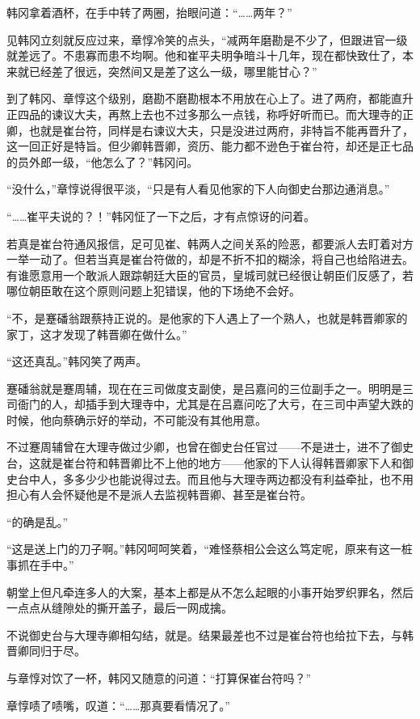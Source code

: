 韩冈拿着酒杯，在手中转了两圈，抬眼问道：“……两年？”

见韩冈立刻就反应过来，章惇冷笑的点头，“减两年磨勘是不少了，但跟进官一级就差远了。不患寡而患不均啊。他和崔平夫明争暗斗十几年，现在都快致仕了，本来就已经差了很远，突然间又是差了这么一级，哪里能甘心？”

到了韩冈、章惇这个级别，磨勘不磨勘根本不用放在心上了。进了两府，都能直升正四品的谏议大夫，再熬上去也不过多那么一点钱，称呼好听而已。而大理寺的正卿，也就是崔台符，同样是右谏议大夫，只是没进过两府，非特旨不能再晋升了，这一回正好是特旨。但少卿韩晋卿，资历、能力都不逊色于崔台符，却还是正七品的员外郎一级，“他怎么了？”韩冈问。

“没什么，”章惇说得很平淡，“只是有人看见他家的下人向御史台那边通消息。”

“……崔平夫说的？！”韩冈怔了一下之后，才有点惊讶的问着。

若真是崔台符通风报信，足可见崔、韩两人之间关系的险恶，都要派人去盯着对方一举一动了。但若当真是崔台符做的，却是不折不扣的糊涂，将自己也给陷进去。有谁愿意用一个敢派人跟踪朝廷大臣的官员，皇城司就已经很让朝臣们反感了，若哪位朝臣敢在这个原则问题上犯错误，他的下场绝不会好。

“不，是蹇磻翁跟蔡持正说的。是他家的下人遇上了一个熟人，也就是韩晋卿家的家丁，这才发现了韩晋卿在做什么。”

“这还真乱。”韩冈笑了两声。

蹇磻翁就是蹇周辅，现在在三司做度支副使，是吕嘉问的三位副手之一。明明是三司衙门的人，却插手到大理寺中，尤其是在吕嘉问吃了大亏，在三司中声望大跌的时候，他向蔡确示好的举动，不可能没有其他用意。

不过蹇周辅曾在大理寺做过少卿，也曾在御史台任官过——不是进士，进不了御史台，这就是崔台符和韩晋卿比不上他的地方——他家的下人认得韩晋卿家下人和御史台中人，多多少少也能说得过去。而且他与大理寺两边都没有利益牵扯，也不用担心有人会怀疑他是不是派人去监视韩晋卿、甚至是崔台符。

“的确是乱。”

“这是送上门的刀子啊。”韩冈呵呵笑着，“难怪蔡相公会这么笃定呢，原来有这一桩事抓在手中。”

朝堂上但凡牵连多人的大案，基本上都是从不怎么起眼的小事开始罗织罪名，然后一点点从缝隙处的撕开盖子，最后一网成擒。

不说御史台与大理寺卿相勾结，就是。结果最差也不过是崔台符也给拉下去，与韩晋卿同归于尽。

与章惇对饮了一杯，韩冈又随意的问道：“打算保崔台符吗？”

章惇啧了啧嘴，叹道：“……那真要看情况了。”

